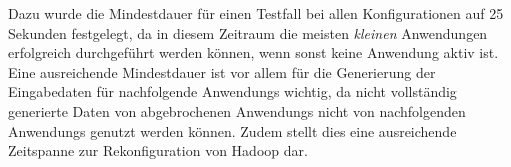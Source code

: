 Dazu wurde die Mindestdauer für einen Testfall bei allen Konfigurationen auf 25 Sekunden festgelegt, da in diesem Zeitraum die meisten \emph{kleinen} Anwendungen erfolgreich durchgeführt werden können, wenn sonst keine Anwendung aktiv ist.
Eine ausreichende Mindestdauer ist vor allem für die Generierung der Eingabedaten für nachfolgende \glspl{Anwendung} wichtig, da nicht vollständig generierte Daten von abgebrochenen \glspl{Anwendung} nicht von nachfolgenden \glspl{Anwendung} genutzt werden können.
Zudem stellt dies eine ausreichende Zeitspanne zur Rekonfiguration von Hadoop dar.
